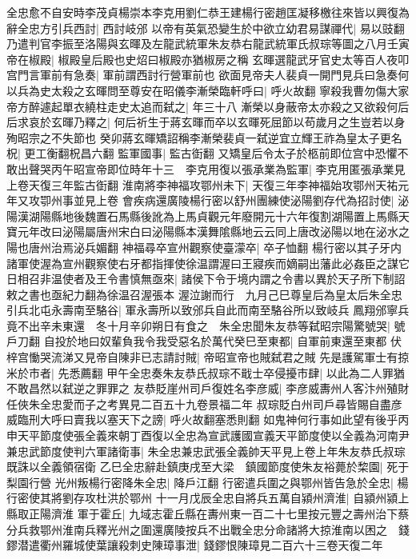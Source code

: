 全忠愈不自安時李茂貞楊崇本李克用劉仁恭王建楊行密趙匡凝移檄往來皆以興復為辭全忠方引兵西討|{
	西討岐邠}
以帝有英氣恐變生於中欲立幼君易謀禪代|{
	易以豉翻}
乃遣判官李振至洛陽與玄暉及左龍武統軍朱友恭右龍武統軍氏叔琮等圖之八月壬寅帝在椒殿|{
	椒殿皇后殿也史炤曰椒殿亦猶椒房之稱}
玄暉選龍武牙官史太等百人夜叩宫門言軍前有急奏|{
	軍前謂西討行營軍前也}
欲面見帝夫人裴貞一開門見兵曰急奏何以兵為史太殺之玄暉問至尊安在昭儀李漸榮臨軒呼曰|{
	呼火故翻}
寧殺我曹勿傷大家帝方醉遽起單衣繞柱走史太追而弑之|{
	年三十八}
漸榮以身蔽帝太亦殺之又欲殺何后后求哀於玄暉乃釋之|{
	何后祈生于蔣玄暉而卒以玄暉死屈節以苟歲月之生豈若以身殉昭宗之不失節也}
癸卯蔣玄暉矯詔稱李漸榮裴貞一弑逆宜立輝王祚為皇太子更名柷|{
	更工衡翻柷昌六翻}
監軍國事|{
	監古衘翻}
又矯皇后令太子於柩前即位宫中恐懼不敢出聲哭丙午昭宣帝即位時年十三　李克用復以張承業為監軍|{
	李克用匿張承業見上卷天復三年監古衘翻}
淮南將李神福攻鄂州未下|{
	天復三年李神福始攻鄂州天祐元年又攻卾州事並見上卷}
會疾病還廣陵楊行密以舒州團練使泌陽劉存代為招討使|{
	泌陽漢湖陽縣地後魏置石馬縣後訛為上馬貞觀元年廢開元十六年復割湖陽置上馬縣天寶元年改曰泌陽屬唐州宋白曰泌陽縣本漢舞隂縣地云云同上唐改泌陽以地在泌水之陽也唐州治焉泌兵媚翻}
神福尋卒宣州觀察使臺濛卒|{
	卒子恤翻}
楊行密以其子牙内諸軍使渥為宣州觀察使右牙都指揮使徐温謂渥曰王寢疾而嫡嗣出藩此必姦臣之謀它日相召非温使者及王令書慎無亟來|{
	諸侯下令于境内謂之令書以異於天子所下制詔敕之書也亟紀力翻為徐温召渥張本}
渥泣謝而行　九月己巳尊皇后為皇太后朱全忠引兵北屯永壽南至駱谷|{
	軍永壽所以致邠兵自此而南至駱谷所以致岐兵}
鳳翔邠寧兵竟不出辛未東還　冬十月辛卯朔日有食之　朱全忠聞朱友恭等弑昭宗陽驚號哭|{
	號戶刀翻}
自投於地曰奴輩負我令我受惡名於萬代癸巳至東都|{
	自軍前東還至東都}
伏梓宫慟哭流涕又見帝自陳非已志請討賊|{
	帝昭宣帝也賊弑君之賊}
先是護駕軍士有掠米於市者|{
	先悉薦翻}
甲午全忠奏朱友恭氏叔琮不戢士卒侵擾市肆|{
	以此為二人罪猶不敢昌然以弑逆之罪罪之}
友恭貶崖州司戶復姓名李彦威|{
	李彦威夀州人客汴州殖財任俠朱全忠愛而子之考異見二百五十九卷景福二年}
叔琮貶白州司戶尋皆賜自盡彦威臨刑大呼曰賣我以塞天下之謗|{
	呼火故翻塞悉則翻}
如鬼神何行事如此望有後乎丙申天平節度使張全義來朝丁酉復以全忠為宣武護國宣義天平節度使以全義為河南尹兼忠武節度使判六軍諸衛事|{
	朱全忠兼忠武張全義帥天平見上卷上年朱友恭氏叔琮既誅以全義領宿衛}
乙巳全忠辭赴鎮庚戌至大梁　鎮國節度使朱友裕薨於棃園|{
	死于梨園行營}
光州叛楊行密降朱全忠|{
	降戶江翻}
行密遣兵圍之與鄂州皆告急於全忠|{
	楊行密使其將劉存攻杜洪於鄂州}
十一月戊辰全忠自將兵五萬自潁州濟淮|{
	自潁州潁上縣取正陽濟淮}
軍于霍丘|{
	九域志霍丘縣在夀州東一百二十七里按元豐之壽州治下蔡}
分兵救鄂州淮南兵釋光州之圍還廣陵按兵不出戰全忠分命諸將大掠淮南以困之　錢鏐潜遣衢州羅城使葉讓殺刺史陳璋事泄|{
	錢鏐恨陳璋見二百六十三卷天復二年}
